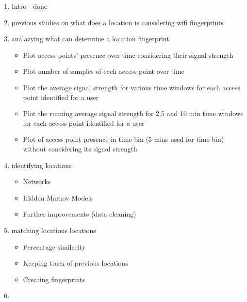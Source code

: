 \begin{enumerate}
  \item Intro - done
  \item previous studies on what does a location is considering wifi
  fingerprints
  \item analazying what can determine a location fingerprint
	\begin{itemize}
		\item Plot access points’ presence over time considering their signal strength
		\item Plot number of samples of each access point over time
		\item Plot the average signal strength for various time windows for each
		access point identified for a user
		\item Plot the running average signal strength for 2,5 and 10 min time windows
		for each access point identified for a user
		\item Plot of access point presence in time bin (5 mins used for time bin)
		without considering its signal strength
	\end{itemize}
  \item identifying locations
	\begin{itemize}
		\item Networks 
		\item Hidden Markov Models 
		\item Further improvements (data cleaning)
	\end{itemize}
  \item matching locations locations
	\begin{itemize}
		\item Percentage similarity 
		\item Keeping track of previous locations 
		\item Creating fingerprints
	\end{itemize}
  \item  
\end{enumerate}
